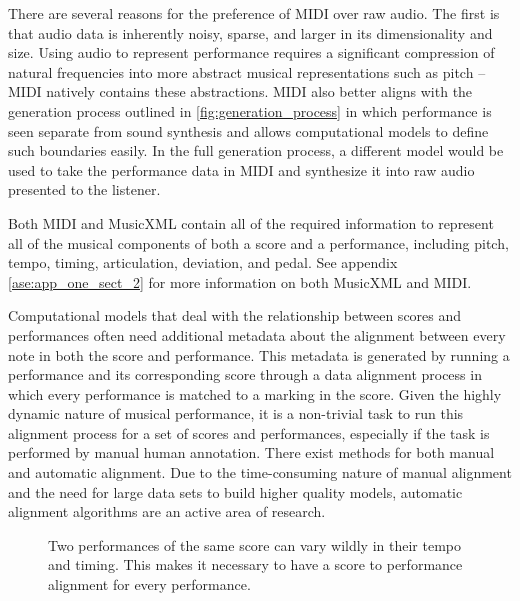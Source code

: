 There are several reasons for the preference of MIDI over raw audio. The first is that audio data is inherently noisy, sparse, and larger in its dimensionality and size. Using audio to represent performance requires a significant compression of natural frequencies into more abstract musical representations such as pitch -- MIDI natively contains these abstractions. MIDI also better aligns with the generation process outlined in \ref{fig:generation_process} in which performance is seen separate from sound synthesis and allows computational models to define such boundaries easily. In the full generation process, a different model would be used to take the performance data in MIDI and synthesize it into raw audio presented to the listener. 

Both MIDI and MusicXML contain all of the required information to represent all of the musical components of both a score and a performance, including pitch, tempo, timing, articulation, deviation, and pedal. See appendix \ref{ase:app_one_sect_2} for more information on both MusicXML and MIDI. 

Computational models that deal with the relationship between scores and performances often need additional metadata about the alignment between every note in both the score and performance. This metadata is generated by running a performance and its corresponding score through a data alignment process in which every performance is matched to a marking in the score. Given the highly dynamic nature of musical performance, it is a non-trivial task to run this alignment process for a set of scores and performances, especially if the task is performed by manual human annotation. There exist methods for both manual and automatic alignment. Due to the time-consuming nature of manual alignment and the need for large data sets to build higher quality models, automatic alignment algorithms are an active area of research.

\begin{figure}
    \centering
    \caption{Two performances of the same score can vary wildly in their tempo and timing. This makes it necessary to have a score to performance alignment for every performance. }
    \label{fig:alignemnt}
\end{figure}

